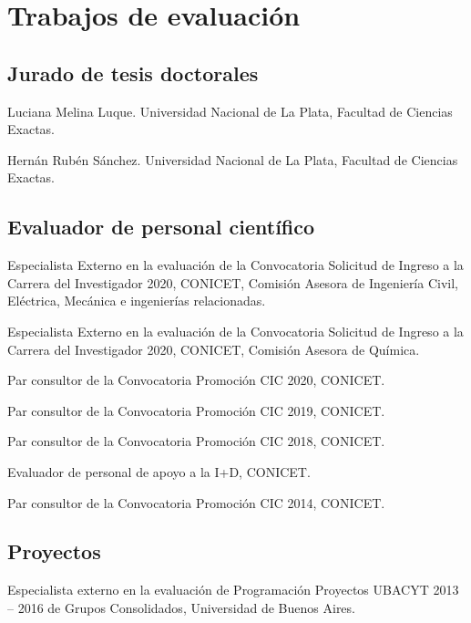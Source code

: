 \section{Trabajos de evaluación}

\subsection{Jurado de tesis doctorales}
 Luciana Melina Luque. Universidad Nacional de La Plata, Facultad de Ciencias Exactas.

 Hernán Rubén Sánchez. Universidad Nacional de La Plata, Facultad de Ciencias Exactas.

\subsection{Evaluador de personal científico}

 Especialista Externo en la evaluación de la Convocatoria Solicitud de Ingreso a la Carrera del Investigador 2020, CONICET,
 Comisión Asesora de Ingeniería Civil, Eléctrica, Mecánica e ingenierías relacionadas.

 Especialista Externo en la evaluación de la Convocatoria Solicitud de Ingreso a la Carrera del Investigador 2020, CONICET, 
Comisión Asesora de Química.

 Par consultor de la Convocatoria Promoción CIC 2020, CONICET.

 Par consultor de la Convocatoria Promoción CIC 2019, CONICET.

 Par consultor de la Convocatoria Promoción CIC 2018, CONICET.

 Evaluador de personal de apoyo a la I+D, CONICET.

 Par consultor de la Convocatoria Promoción CIC 2014, CONICET.

\subsection{Proyectos}
 Especialista externo en la evaluación de Programación Proyectos UBACYT 2013 -- 2016 de Grupos Consolidados, Universidad de Buenos Aires.

